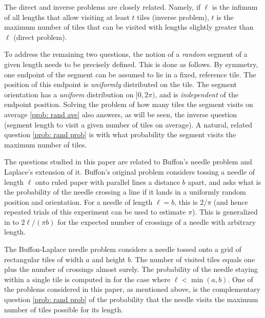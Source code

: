 \documentclass[12pt, a4paper]{article}
\newcommand{\len}{\ell} %
\newcommand{\tiles}{t} %
\begin{document}
The direct and inverse problems are closely related. Namely, if $\len$ is the infimum of all lengths that allow visiting at least $\tiles$ tiles (inverse problem), $\tiles$ is the maximum number of tiles that can be visited with lengths slightly greater than $\len$ (direct problem).

To address the remaining two questions, the notion of a \emph{random} segment of a given length needs to be precisely defined. This is done as follows. By symmetry, one endpoint of the segment can be assumed to lie in a fixed, reference tile. The position of this endpoint is \emph{uniformly} distributed on the tile. The segment orientation has a \emph{uniform} distribution on $[0,2\pi)$, and is \emph{independent} of the endpoint position. Solving the problem of how many tiles the segment visits on average \ref{prob: rand ave} also answers, as will be seen, the inverse question (segment length to visit a given number of tiles on average). A natural, related question \ref{prob: rand prob} is with what probability the segment visits the maximum number of tiles. 


The questions studied in this paper are related to Buffon's needle problem and Laplace's extension of it. Buffon's original problem considers tossing a needle of length $\len$ onto ruled paper with parallel lines a distance $b$ apart, and asks what is the probability of the needle crossing a line if it lands in a uniformly random position and orientation. For a needle of length $\len = b$, this is $2/\pi$ (and hence repeated trials of this experiment can be used to estimate $\pi$). This is generalized in \cite{Ramaley69} to $2\len /(\pi b)$ for the expected number of crossings of a needle with arbitrary length.

The Buffon-Laplace needle problem \cite{Mathai99} considers a needle tossed onto a grid of rectangular tiles of width $a$ and height $b$. The number of visited tiles equals one plus the number of crossings almost surely. The probability of the needle staying within a single tile is computed in \cite{Arnow94} for the case where $\len < \min(a,b)$. One of the problems considered in this paper, as mentioned above, is the complementary question \ref{prob: rand prob} of the probability that the needle visits the maximum number of tiles possible for its length.
\end{document}
